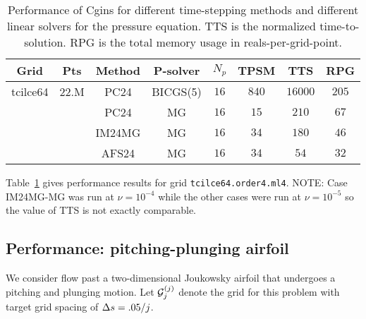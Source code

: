 \begin{table}[hbt]
\begin{center}
\begin{tabular}{|c|c|c|c|c|c|c|c|} \hline 
   Grid          &  Pts     & Method   & P-solver  &   $N_p$  & TPSM     & TTS      &  RPG      \\ \hline
 tcilce64        & $22.$M   & PC24     &  BICGS(5) &  $16$    & $840$    & $16000$  & $205$     \\ 
                 &          & PC24     &  MG       &  $16$    & $15$     & $210$    & $67 $     \\ 
                 &          & IM24MG   &  MG       &  $16$    & $34$     & $180$    & $46 $     \\ 
                 &          & AFS24    &  MG       &  $16$    & $34$     & $54 $    & $32 $     \\ 
\hline 
\end{tabular}
\end{center}
\caption{Performance of Cgins for different time-stepping methods and different linear solvers for the
   pressure equation. TTS is the normalized time-to-solution. 
RPG is the total memory usage in reals-per-grid-point.
}
\label{tab:performanceVariousProblems} 
\end{table}
Table~\ref{tab:performanceVariousProblems} gives performance results for grid {\tt tcilce64.order4.ml4}. 
NOTE: Case IM24MG-MG was run at $\nu=10^{-4}$ while the other cases were run at $\nu=10^{-5}$ so the
value of TTS is not exactly comparable.


\newcommand{\Gcj}{\Gc_j}
\subsection{Performance: pitching-plunging airfoil} \label{sec:performancePitchingPlungingAirfoil}


We consider flow past a two-dimensional Joukowsky airfoil that undergoes a pitching and
plunging motion. Let $\Gcj^{(j)}$ denote the grid for this problem with target grid
spacing of $\Delta s=.05/j$. 

